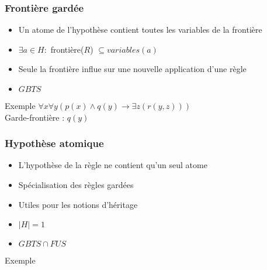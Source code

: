 \begin{frame}
	\frametitle{Frontière gardée}
	\begin{itemize}
		\item Un atome de l'hypothèse contient toutes les variables de la frontière
		\item $\exists a \in H :$ frontière($R$) $\subseteq variables(a)$
		\item Seule la frontière influe sur une nouvelle application d'une règle
		\item $GBTS$
	\end{itemize}
	\vspace{10mm}
	\begin{exampleblock}{Exemple}
		$\forall x \forall y (p(x) \wedge q(y) \rightarrow \exists z (r(y,z)))$\\
		Garde-frontière : $q(y)$
	\end{exampleblock}
\end{frame}

\begin{frame}
	\frametitle{Hypothèse atomique}
	\begin{itemize}
		\item L'hypothèse de la règle ne contient qu'un seul atome
		\item Spécialisation des règles gardées
		\item Utiles pour les notions d'héritage
		\item $|H| = 1$
		\item $GBTS \cap FUS$
	\end{itemize}
	\vspace{10mm}
	\begin{exampleblock}{Exemple}
	\end{exampleblock}
\end{frame}


